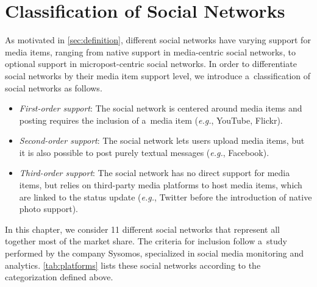{\section{Classification of Social Networks}
\label{sec:classification-of-social-networks}

As motivated in \autoref{sec:definition},
different social networks have varying support
for media items, ranging from native support
in media-centric social networks,
to optional support in micropost-centric social networks.
In order to differentiate social networks by their
media item support level,
we introduce a~classification of social networks as follows.

\begin{itemize}
  \item \emph{First-order support}:
        The social network is centered around media items
        and posting requires the inclusion of a~media item
        (\emph{e.g.}, YouTube, Flickr).
  \item \emph{Second-order support}:
        The social network lets users upload media items,
        but it is also possible to post purely textual messages
        (\emph{e.g.}, Facebook).
  \item \emph{Third-order support}:
        The social network has no direct support for media items,
        but relies on third-party media platforms
        to host media items, which are linked to the status update
        (\emph{e.g.}, Twitter before the introduction of native
        photo support).
\end{itemize}

In this chapter, we consider 11 different social networks
that represent all together most of the market share.
The criteria for inclusion follow
a~study~\cite{levine2011howpeopleshare}
performed by the company Sysomos, specialized in social media
monitoring and analytics.
\autoref{tab:platforms} lists these social networks according to the categorization defined above.

}
